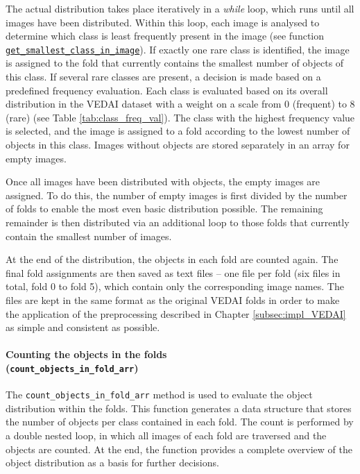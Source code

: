 The actual distribution takes place iteratively in a \textit{while} loop, which runs until all images have been distributed. Within this loop, each image is analysed to determine which class is least frequently present in the image (see function \hyperlink{par:get_smallest_class_in_image}{\lstinline|get_smallest_class_in_image|}). If exactly one rare class is identified, the image is assigned to the fold that currently contains the smallest number of objects of this class. If several rare classes are present, a decision is made based on a predefined frequency evaluation. Each class is evaluated based on its overall distribution in the \acrshort{VEDAI} dataset with a weight on a scale from 0 (frequent) to 8 (rare) (see Table \ref{tab:class_freq_val}). The class with the highest frequency value is selected, and the image is assigned to a fold according to the lowest number of objects in this class. Images without objects are stored separately in an array for empty images.

Once all images have been distributed with objects, the empty images are assigned. To do this, the number of empty images is first divided by the number of folds to enable the most even basic distribution possible. The remaining remainder is then distributed via an additional loop to those folds that currently contain the smallest number of images.

At the end of the distribution, the objects in each fold are counted again. The final fold assignments are then saved as text files – one file per fold (six files in total, fold 0 to fold 5), which contain only the corresponding image names. The files are kept in the same format as the original \acrshort{VEDAI} folds in order to make the application of the preprocessing described in Chapter \ref{subsec:impl_VEDAI} as simple and consistent as possible.


\paragraph{Counting the objects in the folds \\ (\lstinline|count_objects_in_fold_arr|)}
\hypertarget{par:count_objects_in_fold_arr}{}

The \lstinline|count_objects_in_fold_arr| method is used to evaluate the object distribution within the folds. This function generates a data structure that stores the number of objects per class contained in each fold. The count is performed by a double nested loop, in which all images of each fold are traversed and the objects are counted. At the end, the function provides a complete overview of the object distribution as a basis for further decisions.


